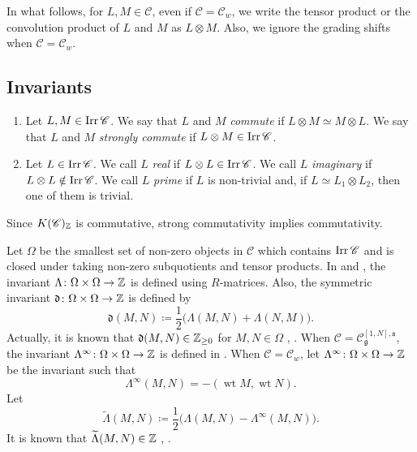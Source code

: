 In what follows, for $L, M \in \mathscr{C}$,
even if $\mathscr{C} = \mathscr{C}_w$,
we write the tensor product or the convolution product
of $L$ and $M$ as $L \otimes M$.
Also, we ignore the grading shifts when $\mathscr{C} = \mathscr{C}_w$.

\subsection{Invariants}
\begin{Def}
\label{Def : commutativity reality and primeness}
\begin{enumerate}
    \item[(i)] Let $L, M \in \mathop{\mathrm{Irr}}\nolimits\mathscr{C}$.
    We say that $L$ and $M$ \emph{commute}
    if $L \otimes M \simeq M \otimes L$.
    We say that $L$ and $M$ \emph{strongly commute}
    if $L \otimes M \in \mathop{\mathrm{Irr}}\nolimits\mathscr{C}$.
    \item[(ii)] Let $L \in \mathop{\mathrm{Irr}}\nolimits\mathscr{C}$.
    We call $L$ \emph{real} if $L \otimes L \in \mathop{\mathrm{Irr}}\nolimits\mathscr{C}$.
    We call $L$ \emph{imaginary}
    if $L \otimes L \notin \mathop{\mathrm{Irr}}\nolimits\mathscr{C}$.
    We call $L$ \emph{prime} if $L$ is non-trivial and,
    if $L \simeq L_1 \otimes L_2$, then one of them is trivial.
\end{enumerate}
\end{Def}

Since $K(\mathscr{C})_{\mathbb{Z}}$ is commutative,
strong commutativity implies commutativity.

Let $\Omega$ be the smallest set of non-zero objects in $\mathscr{C}$
which contains $\mathop{\mathrm{Irr}}\nolimits\mathscr{C}$
and is closed under taking non-zero subquotients and tensor products.
In \cite[$\S$3]{KKOP20} and \cite[$\S$3]{KKKO18},
the invariant $\Lambda \colon \Omega \times \Omega \to \mathbb{Z}$
is defined using $R$-matrices.
Also, the symmetric invariant
$\mathfrak{d} \colon \Omega \times \Omega \to \mathbb{Z}$ is defined by
\[
\mathfrak{d}(M, N)
\coloneq \frac{1}{2}\bigl(\Lambda(M, N) + \Lambda(N, M)\bigr).
\]
Actually, it is known that $\mathfrak{d}(M, N) \in \mathbb{Z}_{\geq 0}$
for $M, N \in \Omega$
\cite[$\S$3]{KKOP20}, \cite[$\S$3]{KKKO18}.
When $\mathscr{C} = \mathscr{C}_{\mathfrak{g}}^{[1, N], \mathfrak{s}}$,
the invariant $\Lambda^{\infty} \colon \Omega \times \Omega \to \mathbb{Z}$
is defined in \cite[Definition 3.6]{KKOP20}.
When $\mathscr{C} = \mathscr{C}_w$,
let $\Lambda^{\infty} \colon \Omega \times \Omega \to \mathbb{Z}$
be the invariant such that
\[
\Lambda^{\infty}(M, N)
= -(\operatorname{wt} M, \operatorname{wt} N).
\]
Let
\[
\widetilde{\Lambda}(M, N)
\coloneq \frac{1}{2}
\bigl(\Lambda(M, N) - \Lambda^{\infty}(M, N)\bigr).
\]
It is known that $\widetilde{\Lambda}(M, N) \in \mathbb{Z}$
\cite[Definition 3.6]{KKOP20}, \cite[Lemma 3.1.2]{KKKO18}.

